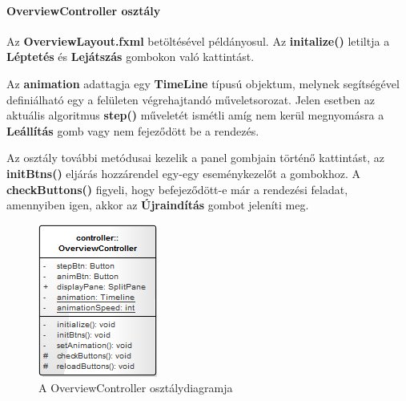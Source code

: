 \documentclass{elteikthesis}
\begin{document}
\paragraph{OverviewController osztály}
Az \textbf{OverviewLayout.fxml} betöltésével példányosul. Az \textbf{initalize()} letiltja a \textbf{Léptetés} és \textbf{Lejátszás} gombokon való kattintást.\par
Az \textbf{animation} adattagja egy \textbf{TimeLine} típusú objektum, melynek segítségével definiálható egy a felületen végrehajtandó műveletsorozat. Jelen esetben az aktuális algoritmus \textbf{step()} műveletét ismétli amíg nem kerül megnyomásra a \textbf{Leállítás} gomb vagy nem fejeződött be a rendezés. \par
Az osztály további metódusai kezelik a panel gombjain történő kattintást, az \textbf{initBtns()} eljárás hozzárendel egy-egy eseménykezelőt a gombokhoz. A \textbf{checkButtons()} figyeli, hogy befejeződött-e már a rendezési feladat, amennyiben igen, akkor az \textbf{Újraindítás} gombot jeleníti meg.
\begin{figure}[H]
	\centering
	\includegraphics{pics/class/OverviewController.png}
	\caption{A OverviewController osztálydiagramja}
\end{figure}
\end{document}
